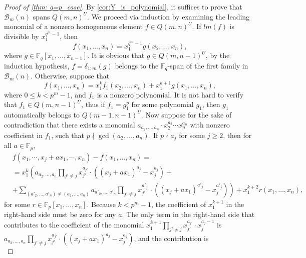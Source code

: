 \documentclass[12pt,a4paper]{report}
\theoremstyle{definition}
\theoremstyle{remark}
\theoremstyle{definition}
\begin{document}
\begin{proof}[Proof of \cref{thm: q=p_case}]
    By \cref{cor:Y_is_polynomial}, it suffices to prove that $\mathcal{B}_m(n)$ spans $Q(m, n)^U$. We proceed via induction by examining the leading monomial of a nonzero homogeneous element $f\in Q(m, n)^U$. If $lm(f)$ is divisible by $x_1^{q^m-1}$, then 
    \begin{equation*}
        f(x_1, \ldots, x_n) = x_1^{q^m-1}g(x_2, \ldots, x_n),
    \end{equation*}
    where $g\in \mathbb{F}_q[x_1, \ldots, x_{n-1}]$. It is obvious that $g\in Q(m, n-1)^U$, by the induction hypothesis, $f = \delta_{1;m}(g)$ belongs to the $\mathbb{F}_q$-span of the first family in $\mathcal{B}_m(n)$. Otherwise, suppose that
     \begin{equation*}
            f(x_1, \ldots, x_n) = x_1^k f_1(x_2, \ldots, x_n) + x_1^{k+1} g(x_1, \ldots, x_n),
        \end{equation*}
        where $0\leq k<p^m-1$, and $f_1$ is a nonzero polynomial. It is not hard to verify that $f_1\in Q(m, n-1)^{U}$, thus if $f_1 = g_1^p$ for some polynomial $g_1$, then $g_1$ automatically belongs to $Q(m-1, n-1)^{U}$. Now suppose for the sake of contradiction that there exists a monomial $a_{a_2, \ldots, a_n}\cdot x_2^{a_2}\cdots x_n^{a_n}$ with nonzero coefficient in $f_1$, such that $p\nmid \gcd(a_2, \ldots, a_n)$. If $p\nmid a_j$ for some $j\geq 2$, then for all $a\in \mathbb{F}_p$, 
        \begin{align*}
            &f(x_1, \cdots, x_j + a x_1, \cdots, x_n) - f(x_1, \ldots, x_n)  =\\ &=x_1^k \left(a_{a_2, \ldots, a_n}\prod\limits_{j'\neq j}x_{j'}^{a_{j'}}\cdot((x_j+ax_1)^{a_j}-x_j^{a_j})+\right.\\
            &\left.+\sum\limits_{(a'_2, \ldots, a'_n)\neq (a_2, \ldots, a_n)}a_{a'_2, \ldots, a'_n}\prod\limits_{j'\neq j}x_{j'}^{a'_{j'}}\cdot((x_j+ax_1)^{a'_j}-x_j^{a'_j}) \right) +x_1^{k+2} r(x_1, \ldots, x_n),
        \end{align*} 
        for some $r\in \mathbb{F}_p[x_1, \ldots, x_n]$. Because $k< p^{m}-1$, the coefficient of $x_1^{k+1}$ in the right-hand side must be zero for any $a$. The only term in the right-hand side that contributes to the coefficient of the monomial $x_1^{k+1}\prod\limits_{j'\neq j}x_{j'}^{a_{j'}}\cdot x_j^{a_j-1}$ is $a_{a_2, \ldots, a_n}\prod\limits_{j'\neq j}x_{j'}^{a_{j'}}\cdot((x_j+ax_1)^{a_j}-x_j^{a_j})$, and the contribution is 
        \begin{equation*}

\end{equation*}
\end{proof}
\end{document}
